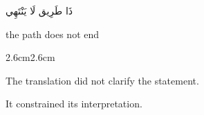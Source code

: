 \begin{center}

\medskip


\medskip

\end{center}

\vspace{3em}

\begin{center}
\begin{AR}
ذَا طَرِيق لَا يَنْتَهِي
\end{AR}

\smallskip

the path does not end
\end{center}

\vspace{3em}

\begin{adjustwidth}{2.6cm}{2.6cm}

The translation did not clarify the statement.

\medskip

It constrained its interpretation.

\vspace{3em}

\end{adjustwidth}

\begin{center}
\end{center}

\vspace{2em}

\begin{center}
\end{center}

\vspace{3em}

